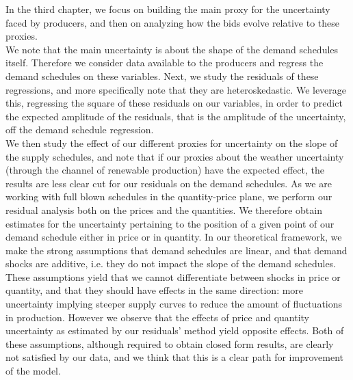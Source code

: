 In the third chapter, we focus on building the main proxy for the uncertainty faced by producers, and then on analyzing how the bids evolve relative to these proxies.\\

We note that the main uncertainty is about the shape of the demand schedules itself. Therefore we consider data available to the producers and regress the demand schedules on these variables. Next, we study the residuals of these regressions, and more specifically note that they are heteroskedastic. We leverage this, regressing the square of these residuals on our variables, in order to predict the expected amplitude of the residuals, that is the amplitude of the uncertainty, off the demand schedule regression.\\

We then study the effect of our different proxies for uncertainty on the slope of the supply schedules, and note that if our proxies about the weather uncertainty (through the channel of renewable production) have the expected effect, the results are less clear cut for our residuals on the demand schedules. As we are working with full blown schedules in the quantity-price plane, we perform our residual analysis both on the prices and the quantities. We therefore obtain estimates for the uncertainty pertaining to the position of a given point of our demand schedule either in price or in quantity. In our theoretical framework, we make the strong assumptions that demand schedules are linear, and that demand shocks are additive, i.e. they do not impact the slope of the demand schedules. These assumptions yield that we cannot differentiate between shocks in price or quantity, and that they should have effects in the same direction: more uncertainty implying steeper supply curves to reduce the amount of fluctuations in production. However we observe that the effects of price and quantity uncertainty as estimated by our residuals' method yield opposite effects. Both of these assumptions, although required to obtain closed form results, are clearly not satisfied by our data, and we think that this is a clear path for improvement of the model.  





 